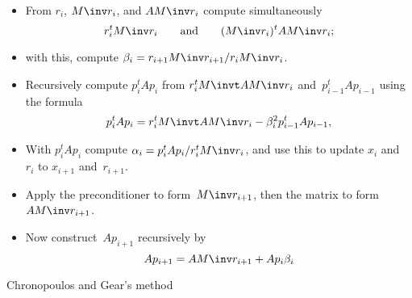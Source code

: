 \begin{rfigure}
\begin{itemize}
\item From $r_i$, $M\inv r_i$, and $AM\inv r_i$ compute simultaneously
\[ r_i^tM\inv r_i\qquad\hbox{and}\qquad (M\inv r_i)^tA M\inv r_i; \]
\item with this,  compute $\beta_i=r_{i+1}M\inv r_{i+1}/r_iM\inv r_i$.
\item Recursively compute $p_i^tAp_i$ from $r_i^tM\invt AM\inv r_i$
and~$p_{i-1}^tAp_{i-1}$ using the formula
\[p_i^tAp_i=r_i^tM\invt AM\inv r_i-\beta_i^2p_{i-1}^tAp_{i-1},\]
\item With $p_i^tA p_i$ compute $\alpha_i = p_i^tAp_i/r_i^tM\inv r_i$,
and use this to update $x_i$ and~$r_i$ to $x_{i+1}$ and~$r_{i+1}$.
\item Apply the preconditioner to form~$M\inv r_{i+1}$, then the matrix to 
form~$AM\inv r_{i+1}$.
\item Now construct~$Ap_{i+1}$ recursively by
\[ Ap_{i+1}=AM\inv r_{i+1}+Ap_i\beta_i \]
\end{itemize}
\caption{Chronopoulos and Gear's method}
\label{fig:azevedo}
\end{rfigure}

